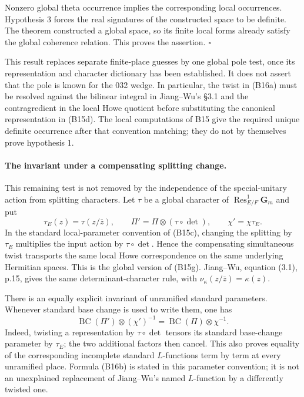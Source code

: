 \documentclass[11pt]{article}
\theoremstyle{definition}\newtheorem{definition}[theorem]{Definition}\newtheorem{remark}[theorem]{Remark}
\begin{document}
Nonzero global theta occurrence implies the corresponding local occurrences. Hypothesis 3 forces the real signatures of the constructed space to be definite. The theorem constructed a global space, so its finite local forms already satisfy the global coherence relation. This proves the assertion. \hfill$\square$

This result replaces separate finite-place guesses by one global pole test, once its representation and character dictionary has been established. It does not assert that the pole is known for the 032 wedge. In particular, the twist in (B16a) must be resolved against the bilinear integral in Jiang--Wu's \S3.1 and the contragredient in the local Howe quotient before substituting the canonical representation in (B15d). The local computations of B15 give the required unique definite occurrence after that convention matching; they do not by themselves prove hypothesis 1.

\paragraph{The invariant under a compensating splitting change.}
This remaining test is not removed by the independence of the special-unitary action from splitting characters. Let $\tau$ be a global character of $\operatorname{Res}^{1}_{E/F}\mathbf G_m$ and put
\[
 \tau_E(z)=\tau(z/\overline z),\qquad
 \Pi'=\Pi\otimes(\tau\circ\det),\qquad
 \chi'=\chi\tau_E.
\]
In the standard local-parameter convention of (B15c), changing the splitting by $\tau_E$ multiplies the input action by $\tau\circ\det$. Hence the compensating simultaneous twist transports the same local Howe correspondence on the same underlying Hermitian spaces. This is the global version of (B15g). Jiang--Wu, equation (3.1), p.15, gives the same determinant-character rule, with $\nu_\kappa(z/\bar z)=\kappa(z)$.

There is an equally explicit invariant of unramified standard parameters. Whenever standard base change is used to write them, one has
\[
 \operatorname{BC}(\Pi')\otimes(\chi')^{-1}
   =\operatorname{BC}(\Pi)\otimes\chi^{-1}.
 \tag{B16b}
\]
Indeed, twisting a representation by $\tau\circ\det$ tensors its standard base-change parameter by $\tau_E$; the two additional factors then cancel. This also proves equality of the corresponding incomplete standard $L$-functions term by term at every unramified place. Formula (B16b) is stated in this parameter convention; it is not an unexplained replacement of Jiang--Wu's named $L$-function by a differently twisted one.
\end{document}

